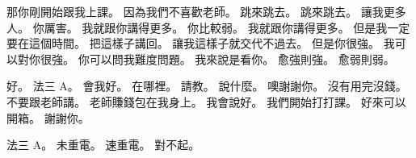 \hypertarget{c01:cue:2151}{}那你剛開始跟我上課。
\hypertarget{c01:cue:2152}{}因為我們不喜歡老師。
\hypertarget{c01:cue:2153}{}跳來跳去。
\hypertarget{c01:cue:2154}{}跳來跳去。
\hypertarget{c01:cue:2155}{}讓我更多人。
\hypertarget{c01:cue:2156}{}你厲害。
\hypertarget{c01:cue:2157}{}我就跟你講得更多。
\hypertarget{c01:cue:2158}{}你比較弱。
\hypertarget{c01:cue:2159}{}我就跟你講得更多。
\hypertarget{c01:cue:2160}{}但是我一定要在這個時間。
\hypertarget{c01:cue:2161}{}把這樣子講回。
\hypertarget{c01:cue:2162}{}讓我這樣子就交代不過去。
\hypertarget{c01:cue:2163}{}但是你很強。
\hypertarget{c01:cue:2164}{}我可以對你很強。
\hypertarget{c01:cue:2165}{}你可以問我難度問題。
\hypertarget{c01:cue:2166}{}我來說是看你。
\hypertarget{c01:cue:2167}{}愈強則強。
\hypertarget{c01:cue:2168}{}愈弱則弱。

\hypertarget{c01:cue:2169}{}好。
\hypertarget{c01:cue:2170}{}法三 A。
\hypertarget{c01:cue:2171}{}會我好。
\hypertarget{c01:cue:2172}{}在哪裡。
\hypertarget{c01:cue:2173}{}請教。
\hypertarget{c01:cue:2174}{}說什麼。
\hypertarget{c01:cue:2175}{}噢謝謝你。
\hypertarget{c01:cue:2176}{}沒有用完沒錢。
\hypertarget{c01:cue:2177}{}不要跟老師講。
\hypertarget{c01:cue:2178}{}老師賺錢包在我身上。
\hypertarget{c01:cue:2179}{}我會說好。
\hypertarget{c01:cue:2180}{}我們開始打打課。
\hypertarget{c01:cue:2181}{}好來可以開箱。
\hypertarget{c01:cue:2182}{}謝謝你。

\hypertarget{c01:cue:2183}{}法三 A。
\hypertarget{c01:cue:2184}{}未重電。
\hypertarget{c01:cue:2185}{}速重電。
\hypertarget{c01:cue:2186}{}對不起。

